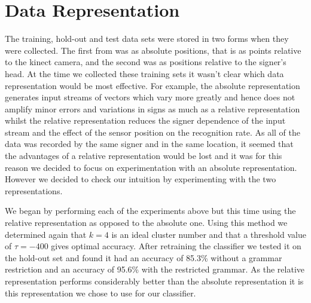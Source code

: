 \section{Data Representation}
The training, hold-out and test data sets were stored in two forms when they were collected. The first from was as absolute positions, that is as points relative to the kinect camera, and the second was as positions relative to the signer's head. At the time we collected these training sets it wasn't clear which data representation would be most effective. For example, the absolute representation generates input streams of vectors which vary more greatly and hence does not amplify minor errors and variations in signs as much as a relative representation whilst the relative representation reduces the signer dependence of the input stream and the effect of the sensor position on the recognition rate. As all of the data was recorded by the same signer and in the same location, it seemed that the advantages of a relative representation would be lost and it was for this reason we decided to focus on experimentation with an absolute representation. However we decided to check our intuition by experimenting with the two representations.

We began by performing each of the experiments above but this time using the relative representation as opposed to the absolute one. Using this method we determined again that $k=4$ is an ideal cluster number and that a threshold value of $\tau = -400$ gives optimal accuracy. After retraining the classifier we tested it on the hold-out set and found it had an accuracy of 85.3\% without a grammar restriction and an accuracy of 95.6\% with the restricted grammar. As the relative representation performs considerably better than the absolute representation it is this representation we chose to use for our classifier. 

